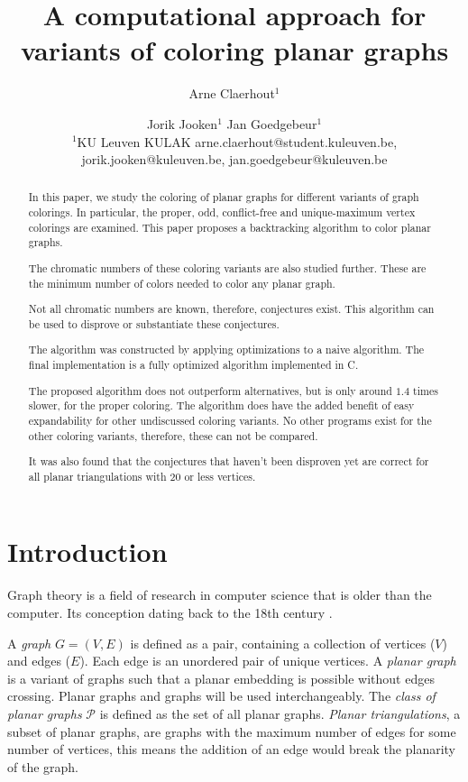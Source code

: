 \documentclass{article}
\title{A computational approach for variants of coloring planar graphs}
\author{
	Arne Claerhout$^1$\and
	Jorik Jooken$^1$\And
	Jan Goedgebeur$^1$\\
	\affiliations
	$^1$KU Leuven KULAK
	\emails
	arne.claerhout@student.kuleuven.be,
	jorik.jooken@kuleuven.be,
	jan.goedgebeur@kuleuven.be
}
\begin{document}
	
\maketitle

\begin{abstract}
	In this paper, we study the coloring of planar graphs for different variants of graph colorings. In particular, the proper, odd, conflict-free and unique-maximum vertex colorings are examined. This paper proposes a backtracking algorithm to color planar graphs.
	
	The chromatic numbers of these coloring variants are also studied further. These are the minimum number of colors needed to color any planar graph.
	
	Not all chromatic numbers are known, therefore, conjectures exist. This algorithm can be used to disprove or substantiate these conjectures.
	
	The algorithm was constructed by applying optimizations to a naive algorithm. The final implementation is a fully optimized algorithm implemented in C.
	
	The proposed algorithm does not outperform alternatives, but is only around $1.4$ times slower, for the proper coloring. The algorithm does have the added benefit of easy expandability for other undiscussed coloring variants. No other programs exist for the other coloring variants, therefore, these can not be compared.
	
	
	It was also found that the conjectures that haven't been disproven yet are correct for all planar triangulations with $20$ or less vertices. 
	
\end{abstract}

\section{Introduction}

Graph theory is a field of research in computer science that is older than the computer. Its conception dating back to the 18th century \cite{euler1741solutio}. 

A \textit{graph} $G = (V, E)$ is defined as a pair, containing a collection of vertices ($V$) and edges ($E$). Each edge is an unordered pair of unique vertices. A \textit{planar graph} is a variant of graphs such that a planar embedding is possible without edges crossing. Planar graphs and graphs will be used interchangeably. The \textit{class of planar graphs} $\mathcal{P}$ is defined as the set of all planar graphs. \textit{Planar triangulations}, a subset of planar graphs, are graphs with the maximum number of edges for some number of vertices, this means the addition of an edge would break the planarity of the graph.
\end{document}
